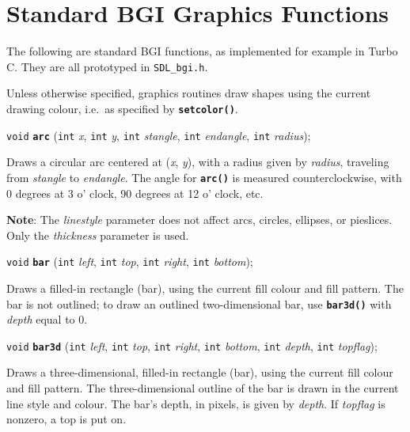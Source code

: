 \documentclass[a4paper,12pt]{article}
\newcommand{\V}{\texttt{void}}      %
\newcommand{\I}{\texttt{int}}       %
\newcommand{\func}[1]{\textbf{\texttt{#1}}}  %
\newcommand{\A}[1]{\emph{#1}}       %
\newcommand{\F}[1]{\texttt{#1}}     %
\newenvironment{bgi}
{ %
  \begin{snugshade}
}
{ %
  \end{snugshade}
}
\begin{document}

\section{Standard BGI Graphics Functions}

The following are standard BGI functions, as implemented for example
in Turbo C. They are all prototyped in \F{SDL\_bgi.h}.

Unless otherwise specified, graphics routines draw shapes using the
current drawing colour, i.e.\ as specified by \func{setcolor()}.


\label{sec:arc}

\begin{bgi}
  \V{} \func{arc} (\I{} \A{x}, \I{} \A{y}, \I{} \A{stangle}, \I{}
  \A{endangle}, \I{} \A{radius});
\end{bgi}

Draws a circular arc centered at (\A{x}, \A{y}), with a radius given
by \A{radius}, traveling from \A{stangle} to \A{endangle}. The angle
for \func{arc()} is measured counterclockwise, with 0 degrees at 3 o'
clock, 90 degrees at 12 o' clock, etc.

\textbf{Note}: The \A{linestyle} parameter does not affect arcs,
circles, ellipses, or pie\-slices. Only the \A{thickness} parameter is
used.


\label{sec:bar}

\begin{bgi}
\V{} \func{bar} (\I{} \A{left}, \I{} \A{top}, \I{} \A{right}, \I{}
\A{bottom});
\end{bgi}

Draws a filled-in rectangle (bar), using the current fill colour and
fill pattern. The bar is not outlined; to draw an outlined
two-dimensional bar, use \func{bar3d()} with \A{depth} equal to 0.


\label{sec:bar3d}

\begin{bgi}
\V{} \func{bar3d} (\I{} \A{left}, \I{} \A{top}, \I{} \A{right}, \I{}
\A{bottom}, \I{} \A{depth}, \I{} \A{topflag});
\end{bgi}

Draws a three-dimensional, filled-in rectangle (bar), using the
current fill colour and fill pattern. The three-dimensional outline of
the bar is drawn in the current line style and colour. The bar's
depth, in pixels, is given by \A{depth}. If \A{topflag} is nonzero, a
top is put on.
\end{document}
